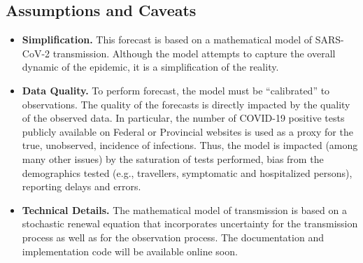 \subsection*{Assumptions and Caveats}
\begin{itemize}

\item \textbf{Simplification.} This forecast is based on a mathematical model of SARS-CoV-2 transmission. Although the model attempts to capture the overall dynamic of the epidemic, it is a simplification of the reality.

\item \textbf{Data Quality.} To perform forecast, the model must be ``calibrated'' to observations. The quality of the forecasts is directly impacted by the quality of the observed data. 
In particular, the number of COVID-19 positive tests publicly available on Federal or Provincial websites is used as a proxy for the true, unobserved, incidence of infections. Thus, the model is impacted (among many other issues) by the saturation of tests performed, bias from the demographics tested (e.g., travellers, symptomatic and hospitalized persons), reporting delays and errors.

\item \textbf{Technical Details.} The mathematical model of transmission is based on a stochastic renewal equation that incorporates uncertainty for the transmission process as well as for the observation process. The documentation and implementation code will be available online soon.


\end{itemize}

